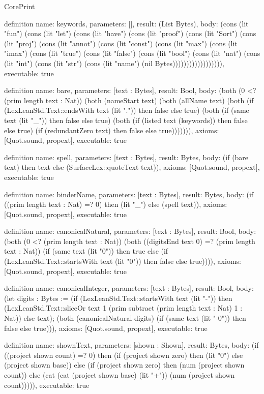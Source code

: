 \begin{lexlean}{CorePrint}
\begin{semanticmodule}
definition{
  name: keywords,
  parameters: [],
  result: (List Bytes),
  body: (cons (lit "fun") (cons (lit "let") (cons (lit "have") (cons (lit "proof") (cons (lit "Sort") (cons (lit "proj") (cons (lit "annot") (cons (lit "const") (cons (lit "max") (cons (lit "imax") (cons (lit "true") (cons (lit "false") (cons (lit "bool") (cons (lit "nat") (cons (lit "int") (cons (lit "str") (cons (lit "name") (nil Bytes)))))))))))))))))),
  executable: true
}

definition{
  name: bare,
  parameters: [text : Bytes],
  result: Bool,
  body: (both (0 <? (prim length text : Nat)) (both (nameStart text) (both (allName text) (both (if (LexLeanStd.Text::endsWith text (lit ".")) then false else true) (both (if (same text (lit "_")) then false else true) (both (if (listed text (keywords)) then false else true) (if (redundantZero text) then false else true))))))),
  axioms: [Quot.sound, propext],
  executable: true
}

definition{
  name: spell,
  parameters: [text : Bytes],
  result: Bytes,
  body: (if (bare text) then text else (SurfaceLex::quoteText text)),
  axioms: [Quot.sound, propext],
  executable: true
}

definition{
  name: binderName,
  parameters: [text : Bytes],
  result: Bytes,
  body: (if ((prim length text : Nat) =? 0) then (lit "_") else (spell text)),
  axioms: [Quot.sound, propext],
  executable: true
}

definition{
  name: canonicalNatural,
  parameters: [text : Bytes],
  result: Bool,
  body: (both (0 <? (prim length text : Nat)) (both ((digitsEnd text 0) =? (prim length text : Nat)) (if (same text (lit "0")) then true else (if (LexLeanStd.Text::startsWith text (lit "0")) then false else true)))),
  axioms: [Quot.sound, propext],
  executable: true
}

definition{
  name: canonicalInteger,
  parameters: [text : Bytes],
  result: Bool,
  body: (let digits : Bytes := (if (LexLeanStd.Text::startsWith text (lit "-")) then (LexLeanStd.Text::sliceOr text 1 (prim subtract (prim length text : Nat) 1 : Nat)) else text); (both (canonicalNatural digits) (if (same text (lit "-0")) then false else true))),
  axioms: [Quot.sound, propext],
  executable: true
}

definition{
  name: shownText,
  parameters: [shown : Shown],
  result: Bytes,
  body: (if ((project shown count) =? 0) then (if (project shown zero) then (lit "0") else (project shown base)) else (if (project shown zero) then (num (project shown count)) else (cat (cat (project shown base) (lit "+")) (num (project shown count))))),
  executable: true
}


\end{semanticmodule}
\end{lexlean}

